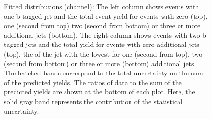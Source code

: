 \begin{figure}[htbp!]
\begin{center}

\caption{Fitted distributions (\mumu channel): 
  The left column shows events with one b-tagged jet and the total event yield for events with zero (top), one (second from top)
  two (second from bottom) or three or more additional jets (bottom).
  The right column shows events with two b-tagged jets and the total yield for events with zero additional jets (top),
 the \pt of the jet with the lowest \pt for one (second from top),
  two (second from bottom) or three or more (bottom) additional jets.
  The hatched bands correspond to the total uncertainty on the sum of
  the predicted yields. The ratios of data to the sum of the
  predicted yields are shown at the bottom of each plot. Here, the solid
  gray band represents the contribution of the statistical uncertainty.  
       \label{fig:lh_mumu_postfitdistr8}}
  \end{center}
\end{figure}

